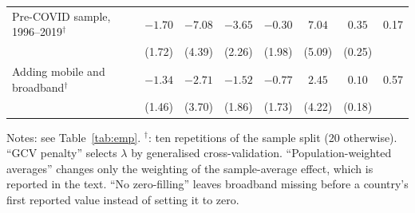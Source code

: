 \documentclass[preprint,12pt,authoryear]{elsarticle}
\begin{document}
\begin{table}[!p]
\begin{threeparttable}
\begin{tabular}{lccccccc}
\quad Pre-COVID sample, 1996--2019$^{\dagger}$ & $-1.70$ & $-7.08$ & $-3.65$ & $-0.30$ & $7.04$ & $0.35$ & 0.17\\
 & (1.72) & (4.39) & (2.26) & (1.98) & (5.09) & (0.25) & \\
\quad Adding mobile and broadband$^{\dagger}$ & $-1.34$ & $-2.71$ & $-1.52$ & $-0.77$ & $2.45$ & $0.10$ & 0.57\\
 & (1.46) & (3.70) & (1.86) & (1.73) & (4.22) & (0.18) & \\
\bottomrule
\end{tabular}
\begin{tablenotes}\scriptsize
\item Notes: see Table~\ref{tab:emp}. $^{\dagger}$: ten repetitions of the sample split (20 otherwise). ``GCV penalty'' selects $\lambda$ by generalised cross-validation. ``Population-weighted averages'' changes only the weighting of the sample-average effect, which is reported in the text. ``No zero-filling'' leaves broadband missing before a country's first reported value instead of setting it to zero.
\end{tablenotes}
\end{threeparttable}
\end{table}

\clearpage
{\singlespacing


}
\end{document}
